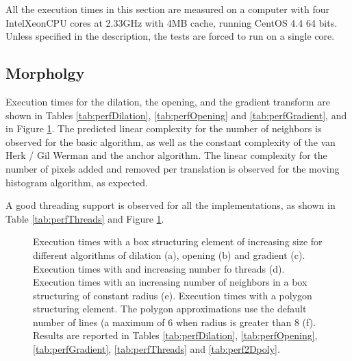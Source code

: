 \documentclass{InsightArticle}
\begin{document}
All the execution times in this section are measured on a computer with four
Intel\textregistered Xeon\textregistered CPU cores at 2.33GHz with 4MB cache,
running CentOS 4.4 64 bits. Unless specified in the description, the tests are
forced to run on a single core.

\subsection{Morpholgy}

Execution times for the dilation, the opening, and the gradient transform are shown in
Tables \ref{tab:perfDilation}, \ref{tab:perfOpening} and \ref{tab:perfGradient}, and in
Figure \ref{fig:consolidatedMorphology-perf}. The predicted linear complexity for the number
of neighbors is observed for the basic algorithm, as well as the constant complexity of the
van Herk / Gil Werman and the anchor algorithm. The linear complexity for the number of
pixels added and removed per translation is observed for the moving histogram algorithm,
as expected.

A good threading support is observed for all the implementations, as shown in Table
\ref{tab:perfThreads} and Figure \ref{fig:consolidatedMorphology-perf}.

\begin{figure}[htbp]
\begin{center}
\caption{Execution times with a box structuring element of increasing size for different algorithms of dilation (a),
opening (b) and gradient (c).
Execution times with and increasing number fo threads (d).
Execution times with an increasing number of neighbors in a box structuring of constant radius (e).
Execution times with a polygon structuring element. The polygon approximations use the default number of lines (a maximum of 6 when radius is greater than 8 (f).\label{fig:consolidatedMorphology-perf}
Results are reported in Tables \ref{tab:perfDilation}, \ref{tab:perfOpening}, \ref{tab:perfGradient},
\ref{tab:perfThreads} and \ref{tab:perf2Dpoly}.
}
\end{center}
\end{figure}
\end{document}
